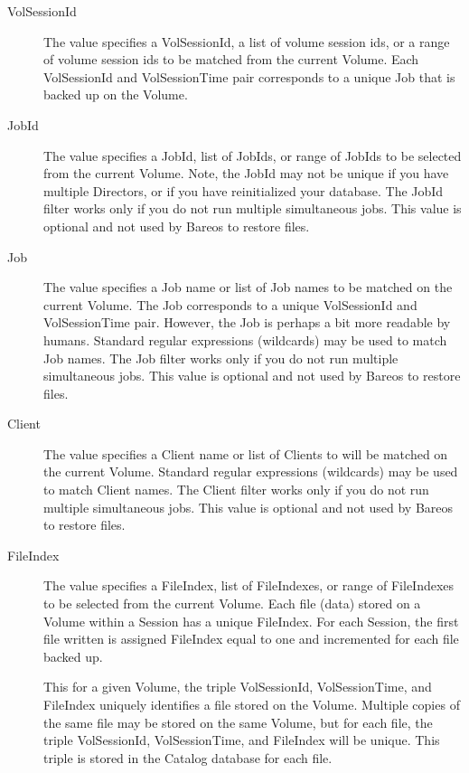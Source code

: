\begin{description}
\item [VolSessionId]
   The value specifies a VolSessionId, a list of volume session ids, or a
   range of volume session ids to be matched from the current Volume.  Each
   VolSessionId and VolSessionTime pair corresponds to a unique Job that is
   backed up on the Volume.

\item [JobId]
   The value specifies a JobId, list of JobIds, or range of JobIds  to be
   selected from the current Volume. Note, the JobId may not be  unique if you
   have multiple Directors, or if you have reinitialized your  database. The
   JobId filter works only if you do not run  multiple simultaneous jobs.
   This value is optional and not used by Bareos to restore files.

\item [Job]
   The value specifies a Job name or list of Job names to  be matched on the
   current Volume. The Job corresponds to a unique  VolSessionId and
   VolSessionTime pair. However, the Job is perhaps a  bit more readable by
   humans. Standard regular expressions (wildcards)  may be used to match Job
   names. The Job filter works only if you do  not run multiple simultaneous
   jobs.
   This value is optional and not used by Bareos to restore files.

\item [Client]
   The value specifies a Client name or list of Clients to  will be matched on
   the current Volume. Standard regular expressions  (wildcards) may be used to
   match Client names. The Client filter works  only if you do not run multiple
   simultaneous jobs.
   This value is optional and not used by Bareos to restore files.

\item [FileIndex]
   The value specifies a FileIndex, list of FileIndexes,  or range of FileIndexes
   to be selected from the current Volume.  Each file (data) stored on a Volume
   within a Session has a unique  FileIndex. For each Session, the first file
   written is assigned  FileIndex equal to one and incremented for each file
   backed up.

   This for a given Volume, the triple VolSessionId, VolSessionTime,  and
   FileIndex uniquely identifies a file stored on the Volume. Multiple  copies of
   the same file may be stored on the same Volume, but for  each file, the triple
   VolSessionId, VolSessionTime, and FileIndex  will be unique. This triple is
   stored in the Catalog database for  each file.


\end{description}
